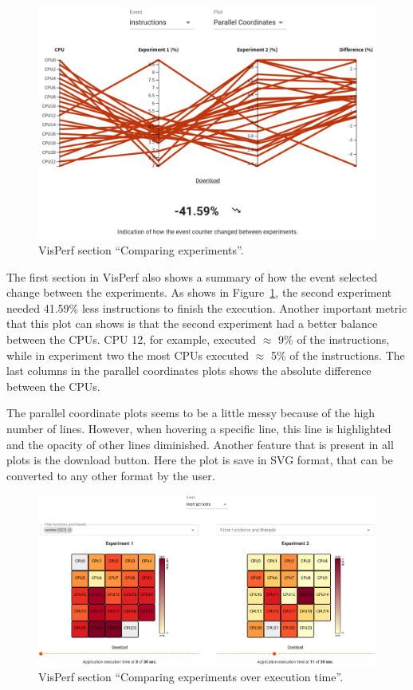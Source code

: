 \begin{figure}
    \centering
    \includegraphics[width=1.0\columnwidth]{../pictures/visperf-section-1.png}
    \caption{VisPerf section ``Comparing experiments''.}
    \label{figure:visperf-section-1}
\end{figure}

The first section in VisPerf also shows a summary of how the event selected change between the experiments. As shows in Figure~\ref{figure:visperf-section-1}, the second experiment needed 41.59\% less instructions to finish the execution. Another important metric that this plot can shows is that the second experiment had a better balance between the CPUs. CPU 12, for example, executed $\approx$ 9\% of the instructions, while in experiment two the most CPUs executed $\approx$ 5\% of the instructions. The last columns in the parallel coordinates plots shows the absolute difference between the CPUs.

The parallel coordinate plots seems to be a little messy because of the high number of lines. However, when hovering a specific line, this line is highlighted and the opacity of other lines diminished. Another feature that is present in all plots is the download button. Here the plot is save in SVG format, that can be converted to any other format by the user.

\begin{figure}
    \centering
    \includegraphics[width=1.0\columnwidth]{../pictures/visperf-section-2.png}
    \caption{VisPerf section ``Comparing experiments over execution time''.}
    \label{figure:visperf-section-2}
\end{figure}

